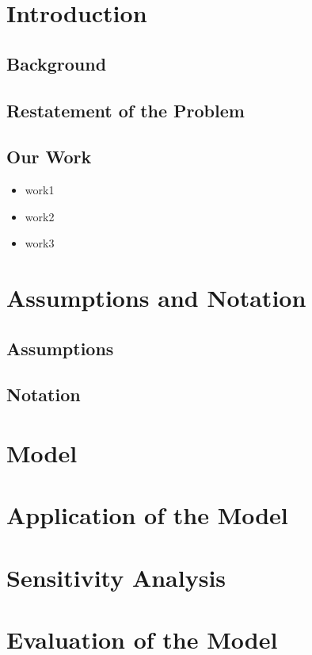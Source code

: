 \documentclass{HZNUMCM}
\begin{document}
\showSummarySheet
\showContents

  \section{Introduction}
    \subsection{Background}
    \subsection{Restatement of the Problem}
    \subsection{Our Work}
    \begin{itemize}
      \item work1
      \item work2
      \item work3
    \end{itemize}

  \section{Assumptions and Notation}
    \subsection{Assumptions}
    \subsection{Notation}

  \section{Model}

  \section{Application of the Model}

  \section{Sensitivity Analysis}

  \section{Evaluation of the Model}
\end{document}
